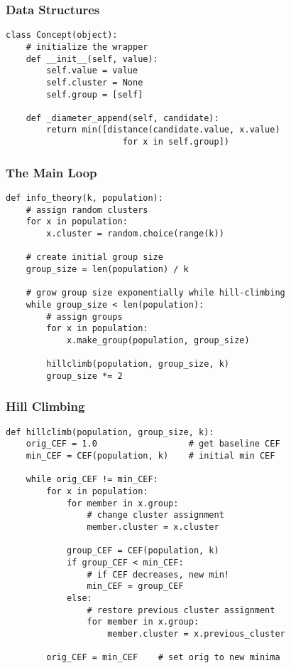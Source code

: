 \documentclass{beamer}
\begin{document}
\begin{frame}[fragile]
\frametitle{Data Structures}
\begin{verbatim}
class Concept(object):
    # initialize the wrapper
    def __init__(self, value):
        self.value = value
        self.cluster = None 
        self.group = [self]
    
    def _diameter_append(self, candidate):
        return min([distance(candidate.value, x.value) 
                       for x in self.group])
\end{verbatim}
\end{frame}

\begin{frame}[fragile]
\frametitle{The Main Loop}
\begin{verbatim}
def info_theory(k, population):
    # assign random clusters
    for x in population:
        x.cluster = random.choice(range(k))

    # create initial group size
    group_size = len(population) / k
   
    # grow group size exponentially while hill-climbing
    while group_size < len(population):
        # assign groups
        for x in population:
            x.make_group(population, group_size)

        hillclimb(population, group_size, k)
        group_size *= 2
\end{verbatim}
\end{frame}

\begin{frame}[fragile]
\frametitle{Hill Climbing}
\begin{verbatim}
def hillclimb(population, group_size, k):
    orig_CEF = 1.0                  # get baseline CEF
    min_CEF = CEF(population, k)    # initial min CEF

    while orig_CEF != min_CEF:
        for x in population:
            for member in x.group:
                # change cluster assignment
                member.cluster = x.cluster
    
            group_CEF = CEF(population, k)
            if group_CEF < min_CEF:
                # if CEF decreases, new min!
                min_CEF = group_CEF
            else:
                # restore previous cluster assignment
                for member in x.group:
                    member.cluster = x.previous_cluster

        orig_CEF = min_CEF    # set orig to new minima
\end{verbatim}
\end{frame}
\end{document}
